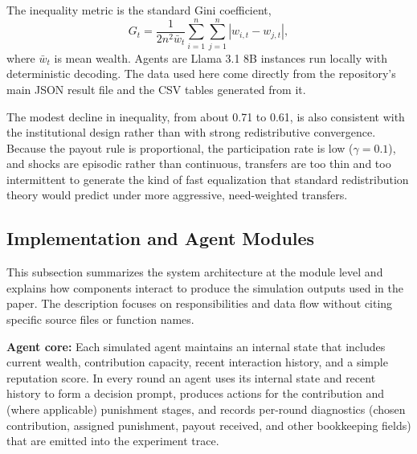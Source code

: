 \documentclass[12pt,letterpaper]{article}
\begin{document}
The inequality metric is the standard Gini coefficient,
\[
G_t = \frac{1}{2n^2\bar{w}_t} \sum_{i=1}^{n}\sum_{j=1}^{n} |w_{i,t}-w_{j,t}|,
\]
where $\bar{w}_t$ is mean wealth. Agents are Llama 3.1 8B instances run locally with deterministic decoding. The data used here come directly from the repository's main JSON result file and the CSV tables generated from it.

The modest decline in inequality, from about 0.71 to 0.61, is also consistent with the institutional design rather than with strong redistributive convergence. Because the payout rule is proportional, the participation rate is low ($\gamma = 0.1$), and shocks are episodic rather than continuous, transfers are too thin and too intermittent to generate the kind of fast equalization that standard redistribution theory would predict under more aggressive, need-weighted transfers.

\subsection*{Implementation and Agent Modules}


This subsection summarizes the system architecture at the module level and explains how components interact to produce the simulation outputs used in the paper. The description focuses on responsibilities and data flow without citing specific source files or function names.

\textbf{Agent core:} Each simulated agent maintains an internal state that includes current wealth, contribution capacity, recent interaction history, and a simple reputation score. In every round an agent uses its internal state and recent history to form a decision prompt, produces actions for the contribution and (where applicable) punishment stages, and records per-round diagnostics (chosen contribution, assigned punishment, payout received, and other bookkeeping fields) that are emitted into the experiment trace.
\end{document}
